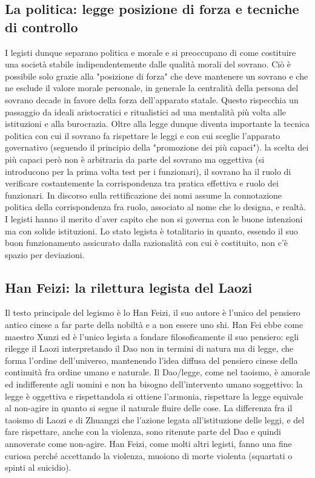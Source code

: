\documentclass[10pt,a4paper]{report}
\begin{document}
\subsection{La politica: legge posizione di forza e tecniche di controllo}
I legisti dunque separano politica e morale e si preoccupano di come costituire una società stabile indipendentemente dalle qualità morali del sovrano. Ciò è possibile solo grazie alla "posizione di forza" che deve mantenere un sovrano e che ne esclude il valore morale personale, in generale la centralità della persona del sovrano decade in favore della forza dell'apparato statale. Questo rispecchia un passaggio da ideali aristocratici e ritualistici ad una mentalità più volta alle istituzioni e alla burocrazia. Oltre alla legge dunque diventa importante la tecnica politica con cui il sovrano fa rispettare le leggi e con cui sceglie l'apparato governativo (seguendo il principio della "promozione dei più capaci"). la scelta dei più capaci però non è arbitraria da parte del sovrano ma oggettiva (si introducono per la prima volta test per i funzionari), il sovrano ha il ruolo di verificare costantemente la corrispondenza tra pratica effettiva e ruolo dei funzionari. In discorso sulla rettificazione dei nomi assume la connotazione politica della corrispondenza fra ruolo, associato al nome che lo designa, e realtà. I legisti hanno il merito d'aver capito che non si governa con le buone intenzioni ma con solide istituzioni. Lo stato legista è totalitario in quanto, essendo il suo buon funzionamento assicurato dalla razionalità con cui è costituito, non c'è spazio per deviazioni. \\
\subsection{Han Feizi: la rilettura legista del Laozi}
Il testo principale del legismo è lo Han Feizi, il suo autore è l'unico del pensiero antico cinese a far parte della nobiltà e a non essere uno shi. Han Fei ebbe come maestro Xunzi ed è l'unico legista a fondare filosoficamente il suo pensiero: egli rilegge il Laozi interpretando il Dao non in termini di natura ma di legge, che forma l'ordine dell'universo, mantenendo l'idea diffusa del pensiero cinese della continuità fra ordine umano e naturale. Il Dao/legge, come nel taoismo, è amorale ed indifferente agli uomini e non ha bisogno dell'intervento umano soggettivo: la legge è oggettiva e rispettandola si ottiene l'armonia, rispettare la legge equivale al non-agire in quanto si segue il naturale fluire delle cose. La differenza fra il taoismo di Laozi e di Zhuangzi che l'azione legata all'istituzione delle leggi, e del fare rispettare, anche con la violenza, sono ritenute parte del Dao e quindi annoverate come non-agire. Han Feizi, come molti altri legisti, fanno una fine curiosa perché accettando la violenza, muoiono di morte violenta (squartati o spinti al suicidio).
\end{document}
